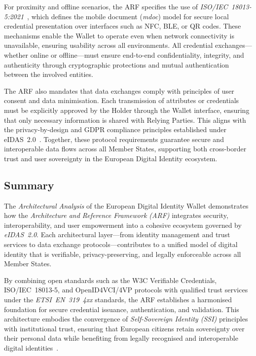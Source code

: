 \documentclass[sigconf,balance,nonacm,authordraft]{acmart}
\begin{document}
For proximity and offline scenarios, the ARF specifies the use of \textit{ISO/IEC~18013-5:2021}~\cite{EU_ARF2024}, which defines the mobile document (\textit{mdoc}) model for secure local credential presentation over interfaces such as NFC, BLE, or QR codes. These mechanisms enable the Wallet to operate even when network connectivity is unavailable, ensuring usability across all environments. All credential exchanges—whether online or offline—must ensure end-to-end confidentiality, integrity, and authenticity through cryptographic protections and mutual authentication between the involved entities.

The ARF also mandates that data exchanges comply with principles of user consent and data minimisation. Each transmission of attributes or credentials must be explicitly approved by the Holder through the Wallet interface, ensuring that only necessary information is shared with Relying Parties. This aligns with the privacy-by-design and GDPR compliance principles established under eIDAS~2.0~\cite{EU_eIDAS2024}. Together, these protocol requirements guarantee secure and interoperable data flows across all Member States, supporting both cross-border trust and user sovereignty in the European Digital Identity ecosystem.

\subsection{Summary}

The \textit{Architectural Analysis} of the European Digital Identity Wallet demonstrates how the \textit{Architecture and Reference Framework (ARF)} integrates security, interoperability, and user empowerment into a cohesive ecosystem governed by \textit{eIDAS~2.0}. Each architectural layer—from identity management and trust services to data exchange protocols—contributes to a unified model of digital identity that is verifiable, privacy-preserving, and legally enforceable across all Member States.

By combining open standards such as the W3C Verifiable Credentials, ISO/IEC~18013-5, and OpenID4VCI/4VP protocols with qualified trust services under the \textit{ETSI~EN~319~4xx} standards, the ARF establishes a harmonised foundation for secure credential issuance, authentication, and validation. This architecture embodies the convergence of \textit{Self-Sovereign Identity (SSI)} principles with institutional trust, ensuring that European citizens retain sovereignty over their personal data while benefiting from legally recognised and interoperable digital identities~\cite{EU_ARF2024,EU_eIDAS2024}.
\end{document}
